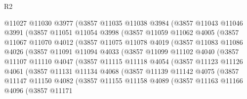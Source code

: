 \begin{lexlean}{R2}
\begin{coremodule}
            @11027
            @11030
            @3977
            (@3857
              @11035
              @11038
              @3984
              (@3857
                @11043
                @11046
                @3991
                (@3857
                  @11051
                  @11054
                  @3998
                  (@3857
                    @11059
                    @11062
                    @4005
                    (@3857
                      @11067
                      @11070
                      @4012
                      (@3857
                        @11075
                        @11078
                        @4019
                        (@3857
                          @11083
                          @11086
                          @4026
                          (@3857
                            @11091
                            @11094
                            @4033
                            (@3857
                              @11099
                              @11102
                              @4040
                              (@3857
                                @11107
                                @11110
                                @4047
                                (@3857
                                  @11115
                                  @11118
                                  @4054
                                  (@3857
                                    @11123
                                    @11126
                                    @4061
                                    (@3857
                                      @11131
                                      @11134
                                      @4068
                                      (@3857
                                        @11139
                                        @11142
                                        @4075
                                        (@3857
                                          @11147
                                          @11150
                                          @4082
                                          (@3857
                                            @11155
                                            @11158
                                            @4089
                                            (@3857
                                              @11163
                                              @11166
                                              @4096
                                              (@3857
                                                @11171

\end{coremodule}
\end{lexlean}
